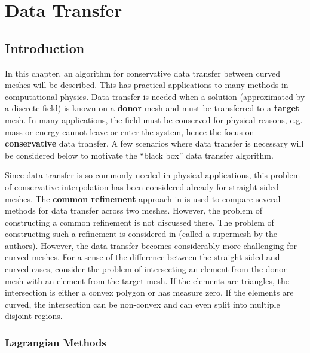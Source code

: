 \chapter{Data Transfer}\label{chap:data-transfer}

\section{Introduction}

In this chapter, an algorithm for conservative data transfer between curved
meshes will be described. This has practical applications to many methods in
computational physics. Data transfer is needed when a solution (approximated
by a discrete field) is known on a \textbf{donor} mesh and must be transferred
to a \textbf{target} mesh. In many applications, the field must be conserved
for physical reasons, e.g. mass or energy cannot leave or enter the system,
hence the focus on \textbf{conservative} data transfer. A few
scenarios where data transfer is necessary will be considered below to
motivate the ``black box'' data transfer algorithm.

Since data transfer is so commonly needed in physical applications, this
problem of conservative interpolation has been considered already for
straight sided meshes. The \textbf{common refinement} approach in
\cite{Jiao2004} is used to compare several methods for data transfer across two
meshes. However, the problem of constructing a common refinement is
not discussed there. The problem of constructing such a refinement is
considered in \cite{Farrell2009, Farrell2011} (called a supermesh by
the authors).
However, the data transfer becomes considerably more challenging for curved
meshes. For a sense of the difference between the straight sided and curved
cases, consider the problem of intersecting an element from the donor mesh
with an element from the target mesh. If the elements are triangles, the
intersection is either a convex polygon or has measure zero. If the elements
are curved, the intersection can be non-convex and can even split into
multiple disjoint regions.

\subsection{Lagrangian Methods}

